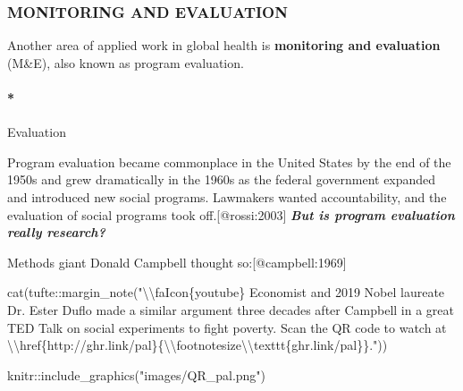 \documentclass[
  letterpaper,
  DIV=11,
  numbers=noendperiod,
  oneside]{scrartcl}
\let\oldparagraph\paragraph
\renewcommand{\paragraph}[1]{\oldparagraph{#1}\mbox{}}
\newenvironment{Shaded}{\begin{snugshade}}{\end{snugshade}}
\newcommand{\FunctionTok}[1]{\textcolor[rgb]{0.28,0.35,0.67}{#1}}
\newcommand{\NormalTok}[1]{\textcolor[rgb]{0.00,0.23,0.31}{#1}}
\newcommand{\SpecialCharTok}[1]{\textcolor[rgb]{0.37,0.37,0.37}{#1}}
\newcommand{\StringTok}[1]{\textcolor[rgb]{0.13,0.47,0.30}{#1}}
\begin{document}
\hypertarget{monitoring-and-evaluation}{%
\subsubsection*{MONITORING AND
EVALUATION}\label{monitoring-and-evaluation}}

Another area of applied work in global health is \textbf{monitoring and
evaluation} (M\&E), also known as program evaluation.

\hypertarget{evaluation}{%
\paragraph*{Evaluation}\label{evaluation}}

Program evaluation became commonplace in the United States by the end of
the 1950s and grew dramatically in the 1960s as the federal government
expanded and introduced new social programs. Lawmakers wanted
accountability, and the evaluation of social programs took
off.{[}@rossi:2003{]} \textbf{\emph{But is program evaluation really
research?}}

Methods giant Donald Campbell thought so:{[}@campbell:1969{]}

\begin{Shaded}
\begin{Highlighting}[]
\FunctionTok{cat}\NormalTok{(tufte}\SpecialCharTok{::}\FunctionTok{margin\_note}\NormalTok{(}\StringTok{"}\SpecialCharTok{\textbackslash{}\textbackslash{}}\StringTok{faIcon\{youtube\} Economist and 2019 Nobel laureate Dr. Ester Duflo made a similar argument three decades after Campbell in a great TED Talk on social experiments to fight poverty. Scan the QR code to watch at }\SpecialCharTok{\textbackslash{}\textbackslash{}}\StringTok{href\{http://ghr.link/pal\}\{}\SpecialCharTok{\textbackslash{}\textbackslash{}}\StringTok{footnotesize}\SpecialCharTok{\textbackslash{}\textbackslash{}}\StringTok{texttt\{ghr.link/pal\}\}."}\NormalTok{))}
\end{Highlighting}
\end{Shaded}


\begin{Shaded}
\begin{Highlighting}[]
\NormalTok{knitr}\SpecialCharTok{::}\FunctionTok{include\_graphics}\NormalTok{(}\StringTok{"images/QR\_pal.png"}\NormalTok{)}
\end{Highlighting}
\end{Shaded}
\end{document}

